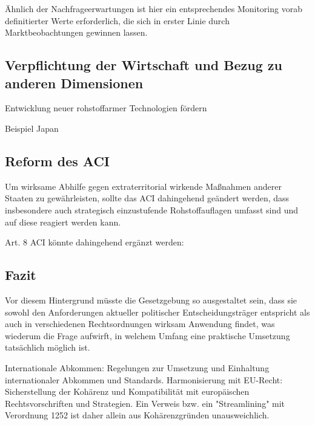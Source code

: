 \documentclass[12pt,a4paper,oneside]{book} %
\begin{document}
Ähnlich der Nachfrageerwartungen ist hier ein entsprechendes Monitoring vorab definitierter Werte erforderlich, die sich in erster Linie durch Marktbeobachtungen gewinnen lassen.

\subsection{Verpflichtung der Wirtschaft und Bezug zu anderen Dimensionen}


Entwicklung neuer rohstoffarmer Technologien fördern

Beispiel Japan

\subsection{Reform des ACI}
Um wirksame Abhilfe gegen extraterritorial wirkende Maßnahmen anderer Staaten zu gewährleisten, sollte das ACI dahingehend geändert werden, dass insbesondere auch strategisch einzustufende Rohstoffauflagen umfasst sind und auf diese reagiert werden kann.

Art. 8 ACI könnte dahingehend ergänzt werden:

\subsection{Fazit}

Vor diesem Hintergrund müsste die Gesetzgebung so ausgestaltet sein, dass sie sowohl den Anforderungen aktueller politischer Entscheidungsträger entspricht als auch in verschiedenen Rechtsordnungen wirksam Anwendung findet, was wiederum die Frage aufwirft, in welchem Umfang eine praktische Umsetzung tatsächlich möglich ist.



Internationale Abkommen: Regelungen zur Umsetzung und Einhaltung internationaler Abkommen und Standards.
Harmonisierung mit EU-Recht: Sicherstellung der Kohärenz und Kompatibilität mit europäischen Rechtsvorschriften und Strategien.
Ein Verweis bzw. ein "Streamlining" mit Verordnung 1252 ist daher allein aus Kohärenzgründen unausweichlich.
\end{document}
